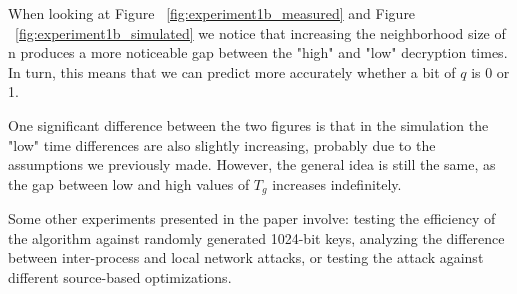 \documentclass[a4paper,10pt,twocolumn,english]{article}
\begin{document}
When looking at Figure ~\ref*{fig:experiment1b_measured} and Figure ~\ref*{fig:experiment1b_simulated} we notice that increasing 
the neighborhood size of n produces a more noticeable gap between the "high" and "low" decryption times. In turn, this means that we can 
predict more accurately whether a bit of $q$ is 0 or 1. 

One significant difference between the two figures is that in the simulation the "low" time differences are also slightly increasing, probably due to the assumptions we previously made.
However, the general idea is still the same, as the gap between low and high values of $T_g$ increases indefinitely.

Some other experiments presented in the paper involve: testing the efficiency of the algorithm against randomly generated 1024-bit keys, analyzing the difference between inter-process and local network attacks, or testing the attack against different source-based optimizations.




\end{document}
